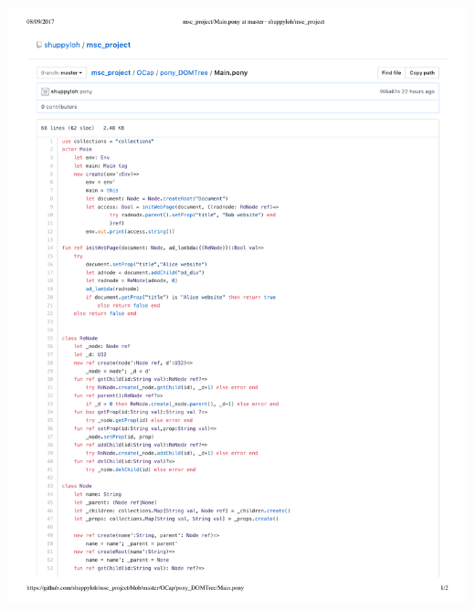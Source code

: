 \documentclass[a4paper,11pt,twoside]{article}
\begin{document}
{\begin{minipage}{\textwidth}
\includegraphics[width=\textwidth,valign=t,page=2]{figures/code_DOM.pdf}
\end{minipage}
}
\end{document}
